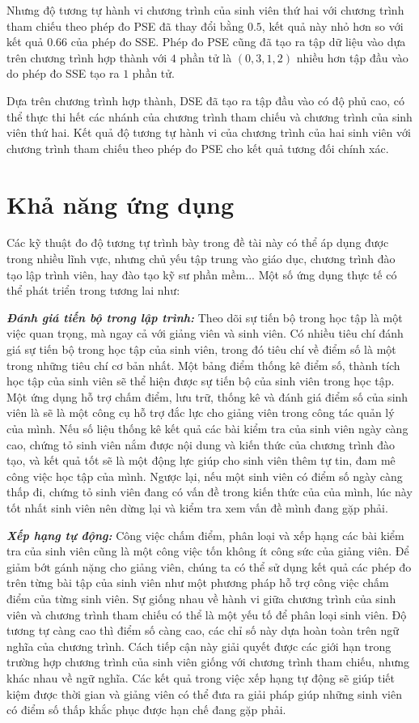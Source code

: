 Nhưng độ tương tự hành vi chương trình của sinh viên thứ hai với chương trình tham 
chiếu theo phép đo PSE đã thay đổi bằng $ 0.5 $, kết quả này nhỏ hơn so với kết quả 
$ 0.66 $ của phép đo SSE. Phép đo PSE cũng đã tạo ra tập dữ liệu vào dựa trên chương 
trình hợp thành với $ 4 $ phần tử là $ (0, 3, 1, 2) $ nhiều hơn tập đầu vào do phép 
đo SSE tạo ra $ 1 $ phần tử.

Dựa trên chương trình hợp thành, DSE đã tạo ra tập đầu vào có độ phủ cao, có thể thực 
thi hết các nhánh của chương trình tham chiếu và chương trình của sinh viên thứ hai. 
Kết quả độ tương tự hành vi của chương trình của hai sinh viên với chương trình tham 
chiếu theo phép đo PSE cho kết quả tương đối chính xác.

\section{Khả năng ứng dụng}

Các kỹ thuật đo độ tương tự trình bày trong đề tài này có thể áp dụng
được trong nhiều lĩnh vực, nhưng chủ yếu tập trung vào giáo dục, chương trình đào 
tạo lập trình viên, hay đào tạo kỹ sư phần mềm... Một
số ứng dụng thực tế có thể phát triển trong tương lai như:

\textbf{\textit{Đánh giá tiến bộ trong lập trình:}} Theo dõi sự tiến
bộ trong học tập là một việc quan trọng, mà ngay cả với giảng viên và
sinh viên. Có nhiều tiêu chí đánh giá sự tiến bộ trong học tập của
sinh viên, trong đó tiêu chí về điểm số là một trong những tiêu chí cơ
bản nhất. Một bảng điểm thống kê điểm số, thành tích học tập của sinh
viên sẽ thể hiện được sự tiến bộ của sinh viên trong học tập. Một ứng
dụng hỗ trợ chấm điểm, lưu trữ, thống kê và đánh giá điểm số của sinh
viên là sẽ là một công cụ hỗ trợ đắc lực cho giảng viên trong công tác
quản lý của mình. Nếu số liệu thống kê kết quả các bài kiểm tra của
sinh viên ngày càng cao, chứng tỏ sinh viên nắm được nội dung và kiến
thức của chương trình đào tạo, và kết quả tốt sẽ là một động lực giúp
cho sinh viên thêm tự tin, đam mê công việc học tập của mình. Ngược
lại, nếu một sinh viên có điểm số ngày càng thấp đi, chứng tỏ sinh
viên đang có vấn đề trong kiến thức của của mình, lúc này tốt nhất
sinh viên nên dừng lại và kiểm tra xem vấn đề mình đang gặp phải.

\textit{\textbf{Xếp hạng tự động:}} Công việc chấm điểm, phân loại và
xếp hạng các bài kiểm tra của sinh viên cũng là một công việc tốn
không ít công sức của giảng viên. Để giảm bớt gánh nặng cho giảng
viên, chúng ta có thể sử dụng kết quả các phép đo trên từng bài tập
của sinh viên như một phương pháp hỗ trợ công việc chấm điểm của từng
sinh viên. Sự giống nhau về hành vi giữa chương trình của sinh viên và
chương trình tham chiếu có thể là một yếu tố để phân loại sinh
viên. Độ tương tự càng cao thì điểm số càng cao, các chỉ số này dựa
hoàn toàn trên ngữ nghĩa của chương trình. Cách tiếp cận này giải
quyết được các giới hạn trong trường hợp chương trình của sinh viên
giống với chương trình tham chiếu, nhưng khác nhau về ngữ nghĩa. Các
kết quả trong việc xếp hạng tự động sẽ giúp tiết kiệm được thời gian
và giảng viên có thể đưa ra giải pháp giúp những sinh viên có điểm số
thấp khắc phục được hạn chế đang gặp phải.

